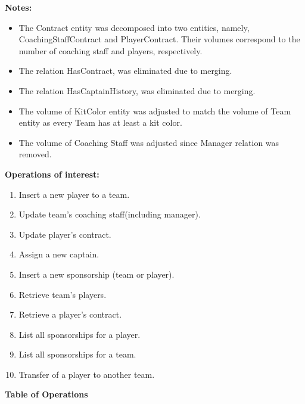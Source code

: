 \textbf{Notes:}
\begin{itemize}
    \item The Contract entity was decomposed into two entities, namely, CoachingStaffContract and PlayerContract. Their volumes correspond to the number of coaching staff and players, respectively.
      \item The relation HasContract, was eliminated due to merging.
    \item The relation HasCaptainHistory, was eliminated due to merging.
    \item The volume of KitColor entity was adjusted to match the volume of Team entity as every Team has at least a  kit color.
    \item The volume of Coaching Staff was adjusted since Manager relation was removed.
\end{itemize}

\pagebreak

\textbf{Operations of interest:}\label{TableOperations}
\begin{enumerate}
  \item Insert a new player to a team.
  \item Update team's coaching staff(including manager).
  \item Update player's contract.
  \item Assign a new captain.
  \item Insert a new sponsorship  (team or player).
  \item Retrieve team's players.
  \item Retrieve a player's contract.
  \item List all sponsorships for a player.
  \item List all sponsorships for a team.
  \item Transfer of a player to another team.
\end{enumerate}

\vspace{12px}

{\centering \textbf{Table of Operations}\\}

